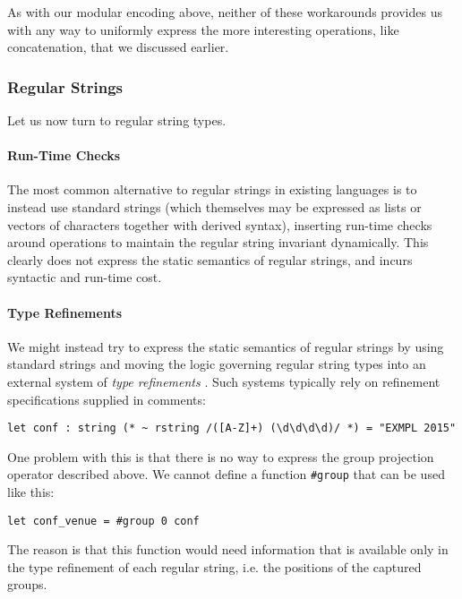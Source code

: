 As with our modular encoding above, neither of these workarounds provides us with any way to uniformly express the more interesting operations, like  concatenation, that we discussed earlier.

\subsubsection{Regular Strings}
Let us now turn to regular string types.

\paragraph{Run-Time Checks}
The most common alternative to regular strings in existing languages is to instead use standard strings (which themselves may be expressed as lists or vectors of characters together with derived syntax), inserting run-time checks around operations to maintain the regular string invariant dynamically. This clearly does not express the static semantics of regular strings, and incurs syntactic and run-time cost.

\paragraph{Type Refinements}
We might instead try to express the static semantics of regular strings by using standard strings and moving the logic governing regular string types into an external system of \emph{type refinements}  \cite{Freeman91}. %
Such  systems typically rely on refinement specifications supplied in comments:
\begin{lstlisting}[numbers=none]
let conf : string (* ~ rstring /([A-Z]+) (\d\d\d\d)/ *) = "EXMPL 2015"
\end{lstlisting}
One problem with this is that there is no way to express the group projection operator described above. We cannot define a function \lstinline{#group} that can be used like this:
\begin{lstlisting}[numbers=none]
let conf_venue = #group 0 conf
\end{lstlisting}
The reason is that this function would need information that is  available only in the type refinement of each regular string, i.e. the positions of the captured groups. %

